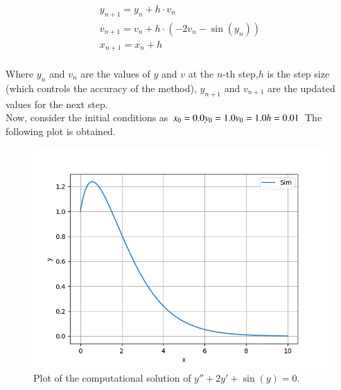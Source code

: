 \documentclass[journal]{IEEEtran}
\begin{document}
\begin{align}
    y_{n+1} = y_n + h \cdot v_n\\
    v_{n+1} = v_n + h \cdot (-2v_n - \sin(y_n))\\
    x_{n+1}=x_{n}+h
\end{align}
\\Where $ y_n$ and $v_n$ are the values of $y$ and $v$ at the $n$-th step,$h$ is the step size (which controls the accuracy of the method),
$y_{n+1}$ and $v_{n+1}$ are the updated values for the next step.\\
Now, consider the initial conditions as
$\\x_0=0.0\\y_0=1.0\\v_0=1.0\\h=0.01\\$
The following plot is obtained.
\begin{figure}[h!]
   \centering
   \includegraphics[width=\columnwidth]{figs/9.1.10.png}
   \caption{Plot of the computational solution of $y'' + 2y' + \sin(y) = 0$.}
   \label{}
\end{figure}
\end{document}
